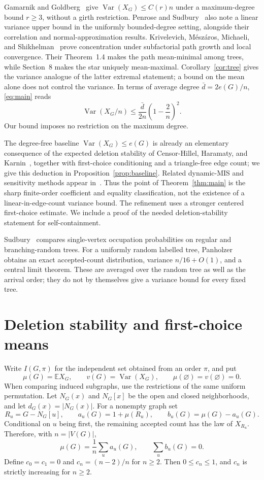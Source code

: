 \documentclass[11pt]{article}
\newcommand{\E}{\mathbb E}
\newcommand{\Var}{\operatorname{Var}}
\begin{document}
Gamarnik and Goldberg~\cite[Theorem~6, equation~(9)]{GG} give $\Var(X_G)\le C(r)n$ under a maximum-degree bound $r\ge3$, without a girth restriction. Penrose and Sudbury~\cite[Section~2.7, discussion following Theorem~7]{PS} also note a linear variance upper bound in the uniformly bounded-degree setting, alongside their correlation and normal-approximation results. Krivelevich, M\'esz\'aros, Michaeli, and Shikhelman~\cite[Theorem~1.2]{KMMS} prove concentration under subfactorial path growth and local convergence. Their Theorem~1.4 makes the path mean-minimal among trees, while Section~8 makes the star uniquely mean-maximal. Corollary~\ref{cor:tree} gives the variance analogue of the latter extremal statement; a bound on the mean alone does not control the variance. In terms of average degree $\bar d=2e(G)/n$, \eqref{eq:main} reads
\[
 \Var(X_G/n)\le \frac{\bar d}{2n}\left(1-\frac2n\right)^2.
\]
Our bound imposes no restriction on the maximum degree.

The degree-free baseline $\Var(X_G)\le e(G)$ is already an elementary consequence of the expected deletion stability of Censor-Hillel, Haramaty, and Karnin~\cite{CHHK}, together with first-choice conditioning and a triangle-free edge count; we give this deduction in Proposition~\ref{prop:baseline}. Related dynamic-MIS and sensitivity methods appear in~\cite{CZ,VY}. Thus the point of Theorem~\ref{thm:main} is the sharp finite-order coefficient and equality classification, not the existence of a linear-in-edge-count variance bound. The refinement uses a stronger centered first-choice estimate. We include a proof of the needed deletion-stability statement for self-containment.

Sudbury~\cite[Theorem~1]{Sudbury} compares single-vertex occupation probabilities on regular and branching-random trees. For a uniformly random labelled tree, Panholzer~\cite[Theorem~4]{Panholzer} obtains an exact accepted-count distribution, variance $n/16+O(1)$, and a central limit theorem. These are averaged over the random tree as well as the arrival order; they do not by themselves give a variance bound for every fixed tree.

\section{Deletion stability and first-choice means}

Write $I(G,\pi)$ for the independent set obtained from an order $\pi$, and put
\[
 \mu(G)=\E X_G,\qquad v(G)=\Var(X_G),\qquad
 \mu(\varnothing)=v(\varnothing)=0.
\]
When comparing induced subgraphs, use the restrictions of the same uniform permutation. Let $N_G(x)$ and $N_G[x]$ be the open and closed neighborhoods, and let $d_G(x)=|N_G(x)|$. For a nonempty graph set
\[
 R_u=G-N_G[u],\qquad a_u(G)=1+\mu(R_u),\qquad
 b_u(G)=\mu(G)-a_u(G).
\]
Conditional on $u$ being first, the remaining accepted count has the law of $X_{R_u}$. Therefore, with $n=|V(G)|$,
\begin{equation}\label{eq:mean}
 \mu(G)=\frac1n\sum_u a_u(G),\qquad \sum_u b_u(G)=0.
\end{equation}
Define $c_0=c_1=0$ and $c_n=(n-2)/n$ for $n\ge2$. Then $0\le c_n\le1$, and $c_n$ is strictly increasing for $n\ge2$.
\end{document}
